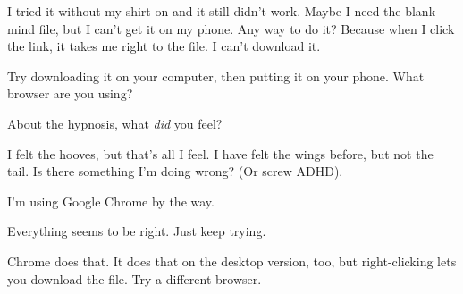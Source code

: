 \documentclass[ebook,12pt,oneside,openany]{memoir}
\begin{document}
\begin{tcolorbox}[title=Shining Wing,colback=blue!5!white,colframe=blue!75!black,coltitle=white]
\begin{tcolorbox}[title=Thunder-Dash]
\par{I tried it without my shirt on and it still didn't work. Maybe I need the blank mind file, but I can't get it on my phone. Any way to do it? Because when I click the link, it takes me right to the file. I can't download it. }
\end{tcolorbox}
\par{Try downloading it on your computer, then putting it on your phone. What browser are you using?}
\newline{}
\par{About the hypnosis, what \textit{did} you feel?}
\end{tcolorbox}
\begin{tcolorbox}[title=C. Thunder Dash,colback=orange!5!white,colframe=orange!75!black,coltitle=white]
\par{I felt the hooves, but that's all I feel. I have felt the wings before, but not the tail. Is there something I'm doing wrong? (Or screw ADHD). }
\newline{}
\par{I'm using Google Chrome by the way.}
\end{tcolorbox}
\begin{tcolorbox}[title=Shining Wing,colback=blue!5!white,colframe=blue!75!black,coltitle=white]
\par{Everything seems to be right. Just keep trying.}
\newline{}
\par{Chrome does that. It does that on the desktop version, too, but right-clicking lets you download the file. Try a different browser.}
\end{tcolorbox}
\end{document}

